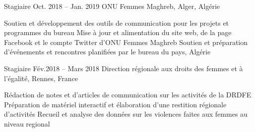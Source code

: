 \begin{joblist}

\item[Stagiaire]{Oct. 2018 -- Jan. 2019 }     
	{ONU Femmes Maghreb, Alger, Algérie}     
	{
			 
		\vspace{-0.5cm}
		\begin{itemize}
			  \iftbftiny \setlength\itemsep{-3pt} \fi
			  \cvitem[\checkmark] Soutien et développement des outils de communication pour les projets et programmes du bureau      
 			  \cvitem[\checkmark] Mise à jour et alimentation du site web, de la page Facebook et le compte Twitter d’ONU Femmes Maghreb                                                            
			  \cvitem[\checkmark] Soutien et préparation d’événements et rencontres planifiées par le bureau du pays, Algérie
		\end{itemize}      

	}


\item[Stagiaire]{Fév.2018 -- Mars 2018 }     
	{Direction régionale aux droits des femmes et à l'égalité, Rennes, France}     
	{
			 
		\iftbftiny \vspace{-0.5cm} \fi
		\begin{itemize}
			  \iftbftiny \setlength\itemsep{-3pt} \fi
			  \cvitem[\checkmark] Rédaction de notes et d'articles de communication sur les activités de la DRDFE      
			  \cvitem[\checkmark] Préparation de matériel interactif et élaboration d'une restition régionale d'activités
			  \cvitem[\checkmark] Recueil et analyse des données sur les violences faites aux femmes au niveau regional
		\end{itemize}      

}
\end{joblist}
